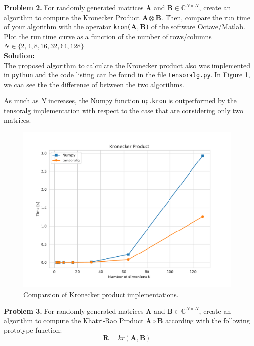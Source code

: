 \documentclass[12pt]{article}
\begin{document}
\noindent
\textbf{Problem 2.} For randomly generated matrices $\bm{A}$ and $\bm{B}\in 
\mathbb{C}^{N\times N}$, create an algorithm to compute the Kronecker Product 
$\bm{A} \otimes \bm{B}$. Then, compare the run time of your algorithm with
the operator \texttt{kron($\bm{A}, \bm{B}$)} of the software 
Octave/Matlab\textregistered. Plot the run time curve as a function of the 
number of rows/columns $N \in \{2,4,8,16,32,64,128\}$.\\

\noindent \textbf{Solution:}\\

The proposed algorithm to calculate the Kronecker product also was implemented 
in \texttt{python} and the code listing can be found in the file 
\texttt{tensoralg.py}. In Figure \ref{kron}, we can see the the difference of 
between the two algorithms.

As much as $N$ increases, the Numpy function \texttt{np.kron} is outperformed 
by the tensoralg implementation with respect to the case that are considering 
only two matrices.\\

\begin{figure}[!ht]
       \centering 
       \includegraphics[width=0.65\linewidth]{figs/kron.pdf}
       \caption{Comparsion of Kronecker product implementations.}
       \label{kron}
   \end{figure}

\noindent
\textbf{Problem 3.} For randomly generated matrices $\bm{A}$ and $\bm{B}\in 
\mathbb{C}^{N\times N}$, create an algorithm to compute the Khatri-Rao Product 
$\bm{A} \diamond \bm{B}$ according with the following prototype function:
\begin{equation*}
\bm{R} = \mathit{kr}(\bm{A}, \bm{B})    
\end{equation*}
\end{document}
